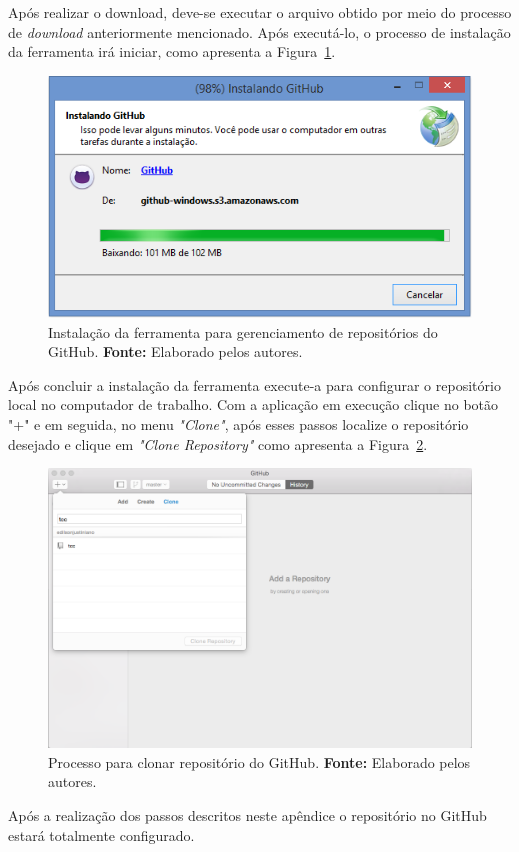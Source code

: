 Após realizar o download, deve-se executar o arquivo obtido por meio do processo de \textit{download} anteriormente mencionado. Após executá-lo, o processo de instalação da ferramenta irá iniciar, como apresenta a Figura~\ref{fig:ap1:instalacao_github_para_windows}.

\captionsetup[figure]{list=no}
\begin{figure}[h!]
	\centerline{\includegraphics[scale=0.5]{./imagens/apendices/instalacao-github-step1.png}}
	\caption[Instalação da ferramenta para gerenciamento de repositórios do GitHub.]
	{Instalação da ferramenta para gerenciamento de repositórios do GitHub. \textbf{Fonte:} Elaborado pelos autores.}
	\label{fig:ap1:instalacao_github_para_windows}
\end{figure}

Após concluir a instalação da ferramenta execute-a para configurar o repositório local no computador de trabalho. Com a aplicação em execução clique no botão "+" e em seguida, no menu \textit{"Clone"}, após esses passos localize o repositório desejado e clique em \textit{"Clone Repository"} como apresenta a Figura~\ref{fig:ap1:clonar_repositorio_github}.

\newpage
\captionsetup[figure]{list=no}
\begin{figure}[h!]
	\centerline{\includegraphics[scale=0.4]{./imagens/apendices/clonar-repositorio-github.png}}
	\caption[Processo para clonar repositório do GitHub.]
	{Processo para clonar repositório do GitHub. \textbf{Fonte:} Elaborado pelos autores.}
	\label{fig:ap1:clonar_repositorio_github}
\end{figure}

Após a realização dos passos descritos neste apêndice o repositório no GitHub estará totalmente configurado.